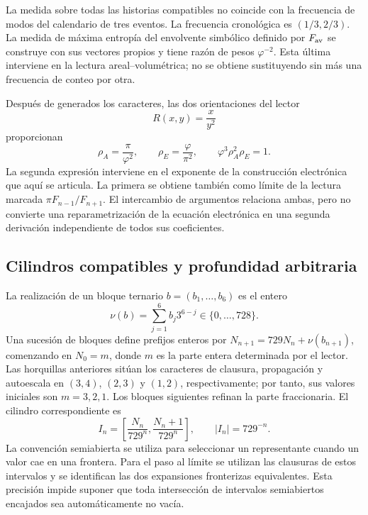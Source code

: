 La medida sobre todas las historias compatibles no coincide con la frecuencia de modos del calendario de tres eventos. La frecuencia cronológica es \((1/3,2/3)\). La medida de máxima entropía del envolvente simbólico definido por \(F_{\rm av}\) se construye con sus vectores propios y tiene razón de pesos \(\varphi^{-2}\). Esta última interviene en la lectura areal--volumétrica; no se obtiene sustituyendo sin más una frecuencia de conteo por otra.




Después de generados los caracteres, las dos orientaciones del lector
\[
 R(x,y)=\frac{x}{y^2}
\]
proporcionan
\begin{equation}
 \rho_A=\frac\pi{\varphi^2},\qquad
 \rho_E=\frac\varphi{\pi^2},\qquad
 \varphi^3\rho_A^2\rho_E=1.
 \label{eq:areal-electron}
\end{equation}
La segunda expresión interviene en el exponente de la construcción electrónica que aquí se articula. La primera se obtiene también como límite de la lectura marcada \(\pi F_{n-1}/F_{n+1}\). El intercambio de argumentos relaciona ambas, pero no convierte una reparametrización de la ecuación electrónica en una segunda derivación independiente de todos sus coeficientes.



\subsection{Cilindros compatibles y profundidad arbitraria}

La realización de un bloque ternario \(b=(b_1,\ldots,b_6)\) es el entero
\[
 \nu(b)=\sum_{j=1}^6b_j3^{6-j}\in\{0,\ldots,728\}.
\]
Una sucesión de bloques define prefijos enteros por \(N_{n+1}=729N_n+\nu(b_{n+1})\), comenzando en \(N_0=m\), donde \(m\) es la parte entera determinada por el lector. Las horquillas anteriores sitúan los caracteres de clausura, propagación y autoescala en \((3,4)\), \((2,3)\) y \((1,2)\), respectivamente; por tanto, sus valores iniciales son \(m=3,2,1\). Los bloques siguientes refinan la parte fraccionaria. El cilindro correspondiente es
\begin{equation}
 I_n=\left[\frac{N_n}{729^n},\frac{N_n+1}{729^n}\right],
 \qquad |I_n|=729^{-n}.
 \label{eq:cilindro}
\end{equation}
La convención semiabierta se utiliza para seleccionar un representante cuando un valor cae en una frontera. Para el paso al límite se utilizan las clausuras de estos intervalos y se identifican las dos expansiones fronterizas equivalentes. Esta precisión impide suponer que toda intersección de intervalos semiabiertos encajados sea automáticamente no vacía.

